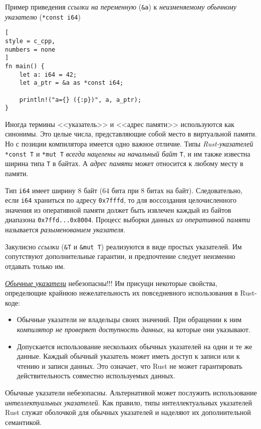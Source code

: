 \documentclass[%
	11pt,
	a4paper,
	utf8,
		]{article}
\begin{document}
Пример приведения \emph{ссылки на переменную} (\verb|&a|) к \emph{неизменяемому обычному указателю} (\verb|*const i64|)
\begin{lstlisting}[
style = c_cpp,
numbers = none
]
fn main() {
    let a: i64 = 42;
    let a_ptr = &a as *const i64;
    
    println!("a={} ({:p})", a, a_ptr);
}
\end{lstlisting}

Иногда термины <<указатель>> и <<адрес памяти>> используются как синонимы. Это целые числа, представляющие собой место в виртуальной памяти. Но с позиции компилятора имеется одно важное отличие. Типы \emph{Rust-указателей} \verb|*const T| и \verb|*mut T| \emph{всегда нацелены на начальный байт} \verb|T|, и им также известна ширина типа \verb|T| в байтах. А \emph{адрес памяти} может относится к любому месту в памяти.

Тип \verb|i64| имеет ширину 8 байт (64 бита при 8 битах на байт). Следовательно, если \verb|i64| храниться по адресу \verb|0x7fffd|, то для воссоздания целочисленного значения из оперативной памяти должет быть извлечен каждый из байтов диапазона \verb|0x7ffd...0x8004|. Процесс выборки данных \emph{из оперативной памяти} называется \emph{разыменованием указателя}.

Закулисно \emph{ссылки} (\verb|&T| и \verb|&mut T|) реализуются в виде простых указателей. Им сопутствуют дополнительные гарантии, и предпочтение следует неизменно отдавать только им.

{\color{red} \emph{\underline{Обычные указатели}} небезопасны!!!} Им присущи некоторые свойства, определющие крайнюю нежелательность их повседневного использования в Rust-коде:
\begin{itemize}
	\item {\color{red}Обычные указатели не владельцы своих значений}. При обращении к ним \emph{компилятор не проверяет доступность данных}, на которые они указывают.
	
	\item {\color{red}Допускается использование нескольких обычных указателей на одни и те же данные}. Каждый обычный указатель может иметь доступ к записи или к чтению и записи данных. Это означает, что Rust не может гарантировать действительность совместно используемых данных.
\end{itemize}

Обычные указатели небезопасны. Альтернативой может послужить использование \emph{интеллектуальных указателей}. Как правило, типы интеллектуальных указателей Rust служат оболочкой для обычных указателей и наделяют их дополнительной семантикой.
\end{document}
